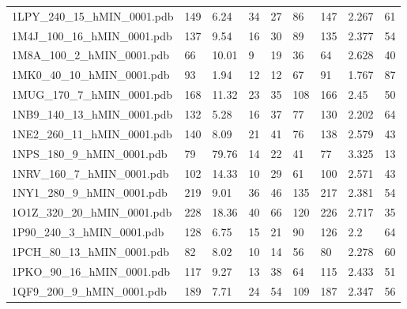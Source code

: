 \documentclass{bioinfo}
\begin{document}
\begin{table*}[!t]
{\begin{tabular}{lllllllll}
    1LPY\_240\_15\_hMIN\_0001.pdb & 149      & 6.24       & 34          & 27          & 86          & 147     & 2.267           & 61           \\
    1M4J\_100\_16\_hMIN\_0001.pdb & 137      & 9.54       & 16          & 30          & 89          & 135     & 2.377           & 54           \\
    1M8A\_100\_2\_hMIN\_0001.pdb & 66       & 10.01      & 9           & 19          & 36          & 64      & 2.628           & 40           \\
    1MK0\_40\_10\_hMIN\_0001.pdb & 93       & 1.94       & 12          & 12          & 67          & 91      & 1.767           & 87           \\
    1MUG\_170\_7\_hMIN\_0001.pdb & 168      & 11.32      & 23          & 35          & 108         & 166     & 2.45            & 50           \\
    1NB9\_140\_13\_hMIN\_0001.pdb & 132      & 5.28       & 16          & 37          & 77          & 130     & 2.202           & 64           \\
    1NE2\_260\_11\_hMIN\_0001.pdb & 140      & 8.09       & 21          & 41          & 76          & 138     & 2.579           & 43           \\
    1NPS\_180\_9\_hMIN\_0001.pdb & 79       & 79.76      & 14          & 22          & 41          & 77      & 3.325           & 13           \\
    1NRV\_160\_7\_hMIN\_0001.pdb & 102      & 14.33      & 10          & 29          & 61          & 100     & 2.571           & 43           \\
    1NY1\_280\_9\_hMIN\_0001.pdb & 219      & 9.01       & 36          & 46          & 135         & 217     & 2.381           & 54           \\
    1O1Z\_320\_20\_hMIN\_0001.pdb & 228      & 18.36      & 40          & 66          & 120         & 226     & 2.717           & 35           \\
    1P90\_240\_3\_hMIN\_0001.pdb & 128      & 6.75       & 15          & 21          & 90          & 126     & 2.2             & 64           \\
    1PCH\_80\_13\_hMIN\_0001.pdb & 82       & 8.02       & 10          & 14          & 56          & 80      & 2.278           & 60           \\
    1PKO\_90\_16\_hMIN\_0001.pdb & 117      & 9.27       & 13          & 38          & 64          & 115     & 2.433           & 51           \\
    1QF9\_200\_9\_hMIN\_0001.pdb & 189      & 7.71       & 24          & 54          & 109         & 187     & 2.347           & 56           \\

\end{tabular}}
\end{table*}
\end{document}
